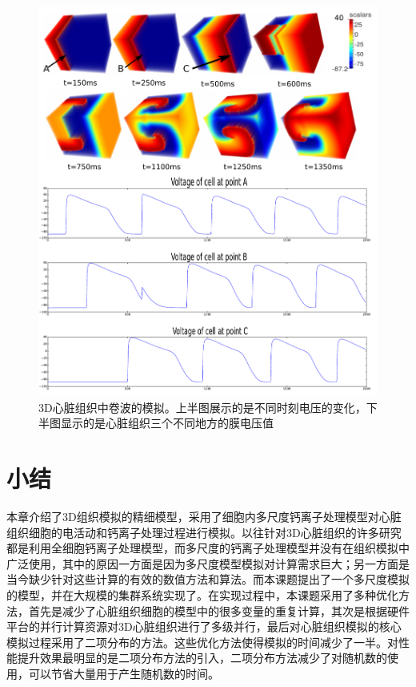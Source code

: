 \begin{figure}[htbp]
\includegraphics[width=\textwidth]{figs/voltage}
\caption{3D心脏组织中卷波的模拟。上半图展示的是不同时刻电压的变化，下半图显示的是心脏组织三个不同地方的膜电压值}
\label{arrhythmia}
\end{figure}

\section{小结}
本章介绍了3D组织模拟的精细模型，采用了细胞内多尺度钙离子处理模型对心脏组织细胞的电活动和钙离子处理过程进行模拟。以往针对3D心脏组织的许多研究都是利用全细胞钙离子处理模型，而多尺度的钙离子处理模型并没有在组织模拟中广泛使用，其中的原因一方面是因为多尺度模型模拟对计算需求巨大；另一方面是当今缺少针对这些计算的有效的数值方法和算法。而本课题提出了一个多尺度模拟的模型，并在大规模的集群系统实现了。在实现过程中，本课题采用了多种优化方法，首先是减少了心脏组织细胞的模型中的很多变量的重复计算，其次是根据硬件平台的并行计算资源对3D心脏组织进行了多级并行，最后对心脏组织模拟的核心模拟过程采用了二项分布的方法。这些优化方法使得模拟的时间减少了一半。对性能提升效果最明显的是二项分布方法的引入，二项分布方法减少了对随机数的使用，可以节省大量用于产生随机数的时间。

